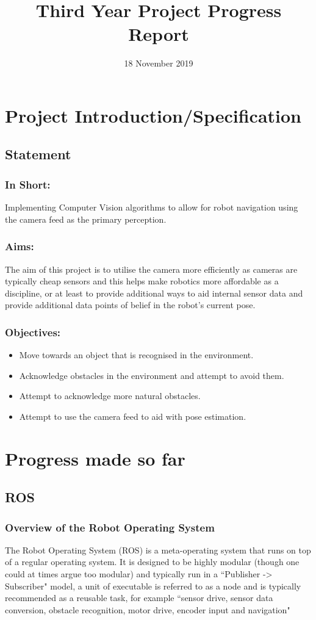 \documentclass[10pt,a4paper]{report}
\title{Third Year Project Progress Report}
\date{18 November 2019}
\begin{document}
\maketitle
\section*{Project Introduction/Specification}
	\subsection*{Statement}
		\subsubsection*{In Short:}
			Implementing Computer Vision algorithms to allow for robot navigation using the camera feed as the primary perception.
		\subsubsection*{Aims:}
			The aim of this project is to utilise the camera more efficiently as cameras are typically cheap sensors and this helps make robotics more affordable as a discipline, or at least to provide additional ways to aid internal sensor data and provide additional data points of belief in the robot's current pose.
		\subsubsection*{Objectives:}
			\begin{itemize}
				\item Move towards an object that is recognised in the environment. 
				\item Acknowledge obstacles in the environment and attempt to avoid them.
				\item Attempt to acknowledge more natural obstacles.
				\item Attempt to use the camera feed to aid with pose estimation.
			\end{itemize}
\section*{Progress made so far}
	\subsection*{ROS}
		\subsubsection*{Overview of the Robot Operating System}
			The Robot Operating System (ROS) is a meta-operating system that runs on top of a regular operating system. It is designed to be highly modular (though one could at times argue too modular) and typically run in a ``Publisher -> Subscriber" model, a unit of executable is referred to as a node and is typically recommended as a reusable task, for example ``sensor drive, sensor data conversion, obstacle recognition, motor drive, encoder input and navigation"\cite{pyo_ros_en_2017}
\end{document}
